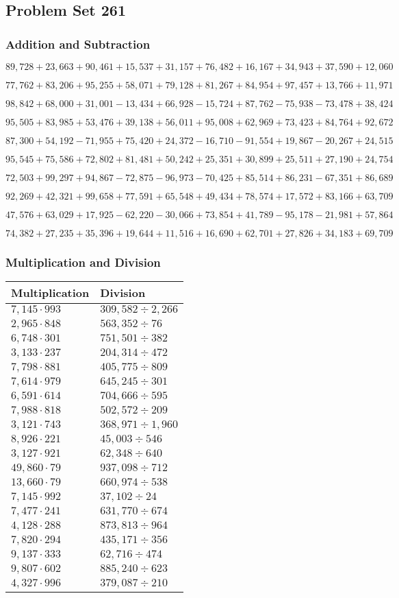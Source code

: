 \hypertarget{problem-set-261}{%
\subsection{Problem Set 261}\label{problem-set-261}}

\hypertarget{addition-and-subtraction}{%
\subsubsection{Addition and
Subtraction}\label{addition-and-subtraction}}

\(89,728+23,663+90,461+15,537+31,157+76,482+16,167+34,943+37,590+12,060\)

\(77,762+83,206+95,255+58,071+79,128+81,267+84,954+97,457+13,766+11,971\)

\(98,842+68,000+31,001-13,434+66,928-15,724+87,762-75,938-73,478+38,424\)

\(95,505+83,985+53,476+39,138+56,011+95,008+62,969+73,423+84,764+92,672\)

\(87,300+54,192-71,955+75,420+24,372-16,710-91,554+19,867-20,267+24,515\)

\(95,545+75,586+72,802+81,481+50,242+25,351+30,899+25,511+27,190+24,754\)

\(72,503+99,297+94,867-72,875-96,973-70,425+85,514+86,231-67,351+86,689\)

\(92,269+42,321+99,658+77,591+65,548+49,434+78,574+17,572+83,166+63,709\)

\(47,576+63,029+17,925-62,220-30,066+73,854+41,789-95,178-21,981+57,864\)

\(74,382+27,235+35,396+19,644+11,516+16,690+62,701+27,826+34,183+69,709\)

\hypertarget{multiplication-and-division}{%
\subsubsection{Multiplication and
Division}\label{multiplication-and-division}}

\begin{longtable}[]{@{}ll@{}}
\toprule
Multiplication & Division\tabularnewline
\midrule
\endhead
\(7,145\cdot993\) & \(309,582÷2,266\)\tabularnewline
\(2,965\cdot848\) & \(563,352 ÷76\)\tabularnewline
\(6,748\cdot301\) & \(751,501÷382\)\tabularnewline
\(3,133\cdot237\) & \(204,314÷472\)\tabularnewline
\(7,798\cdot881\) & \(405,775÷809\)\tabularnewline
\(7,614\cdot979\) & \(645,245÷301\)\tabularnewline
\(6,591\cdot614\) & \(704,666÷595\)\tabularnewline
\(7,988\cdot818\) & \(502,572÷209\)\tabularnewline
\(3,121\cdot743\) & \(368,971÷1,960\)\tabularnewline
\(8,926\cdot221\) & \(45,003÷546\)\tabularnewline
\(3,127\cdot921\) & \(62,348÷640\)\tabularnewline
\(49,860\cdot79\) & \(937,098÷712\)\tabularnewline
\(13,660\cdot79\) & \(660,974÷538\)\tabularnewline
\(7,145\cdot992\) & \(37,102÷24\)\tabularnewline
\(7,477\cdot241\) & \(631,770÷674\)\tabularnewline
\(4,128\cdot288\) & \(873,813÷964\)\tabularnewline
\(7,820\cdot294\) & \(435,171÷356\)\tabularnewline
\(9,137\cdot333\) & \(62,716÷474\)\tabularnewline
\(9,807\cdot602\) & \(885,240÷623\)\tabularnewline
\(4,327\cdot996\) & \(379,087÷210\)\tabularnewline
\bottomrule
\end{longtable}
